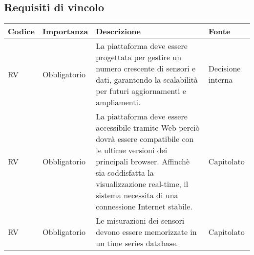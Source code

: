 \subsection{Requisiti di vincolo}
\setcounter{rowcounter}{0}
\begin{longtable}{|C{1.5cm}|C{2cm}|L{5cm}|C{2cm}|}
    \hline
    \textbf{Codice} & \textbf{Importanza} & \textbf{Descrizione} & \textbf{Fonte}  \\

    \hline
     RV & Obbligatorio & La piattaforma deve essere progettata per gestire un numero crescente di sensori e dati, garantendo la scalabilità per futuri aggiornamenti e ampliamenti. & Decisione interna\\

    \hline
     RV & Obbligatorio & La piattaforma deve essere accessibile tramite Web perciò dovrà essere compatibile con le ultime versioni dei principali browser. Affinchè sia soddisfatta la visualizzazione real-time, il sistema necessita di una connessione Internet stabile. & Capitolato\\   

    \hline
     RV & Obbligatorio & Le misurazioni dei sensori devono essere memorizzate in un time series database. & Capitolato\\   
    
    \hline
\end{longtable}




